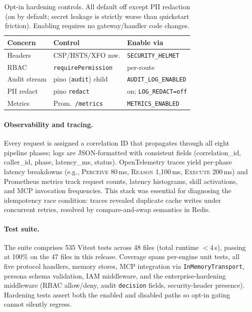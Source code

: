 \documentclass[11pt]{article}
\begin{document}
\begin{table}[t]
  \footnotesize
  \centering
  \setlength{\tabcolsep}{3pt}
  \begin{tabular}{lll}
    \toprule
    Concern & Control & Enable via \\
    \midrule
    Headers       & CSP/HSTS/XFO mw.      & \texttt{SECURITY\_HELMET} \\
    RBAC          & \texttt{requirePermission} & per-route \\
    Audit stream  & pino (\texttt{audit}) child  & \texttt{AUDIT\_LOG\_ENABLED} \\
    PII redact    & pino \texttt{redact}     & on; \texttt{LOG\_REDACT=off} \\
    Metrics       & Prom.\ \texttt{/metrics} & \texttt{METRICS\_ENABLED} \\
    \bottomrule
  \end{tabular}
  \caption{Opt-in hardening controls. All default off except PII redaction (on by default; secret leakage is strictly worse than quickstart friction). Enabling requires no gateway/handler code changes.}
  \label{tab:hardening}
\end{table}

\paragraph{Observability and tracing.} Every request is assigned a correlation ID that propagates through all eight pipeline phases; logs are JSON-formatted with consistent fields (correlation\_id, caller\_id, phase, latency\_ms, status). OpenTelemetry traces yield per-phase latency breakdowns (e.g., \textsc{Perceive} 80\,ms, \textsc{Reason} 1,100\,ms, \textsc{Execute} 200\,ms) and Prometheus metrics track request counts, latency histograms, skill activations, and MCP invocation frequencies. This stack was essential for diagnosing the idempotency race condition: traces revealed duplicate cache writes under concurrent retries, resolved by compare-and-swap semantics in Redis.

\paragraph{Test suite.} The suite comprises 535 Vitest tests across 48 files (total runtime $<$4\,s), passing at 100\% on the 47 files in this release. Coverage spans per-engine unit tests, all five protocol handlers, memory stores, MCP integration via \texttt{InMemoryTransport}, persona schema validation, IAM middleware, and the enterprise-hardening middleware (RBAC allow/deny, audit \texttt{decision} fields, security-header presence). Hardening tests assert both the enabled and disabled paths so opt-in gating cannot silently regress.
\end{document}
